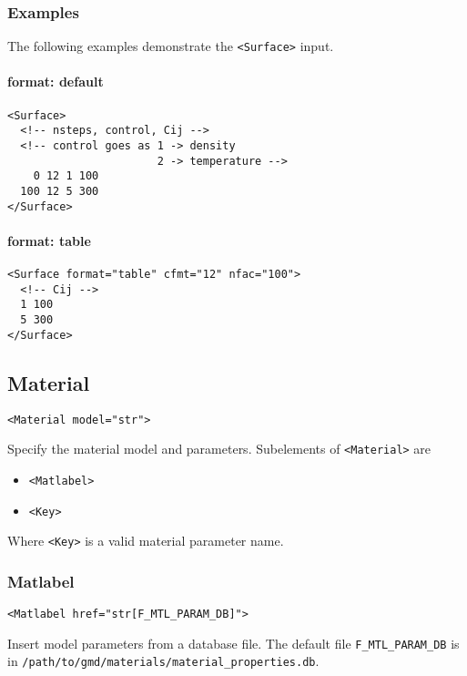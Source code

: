 \documentclass[11pt]{report}
\newcommand{\tag}[1]{\texttt{<#1>}}
\begin{document}
\subsubsection{Examples}
The following examples demonstrate the \tag{Surface} input.

\paragraph{format: default}
\begin{verbatim}
<Surface>
  <!-- nsteps, control, Cij -->
  <!-- control goes as 1 -> density
                       2 -> temperature -->
    0 12 1 100
  100 12 5 300
</Surface>
\end{verbatim}

\paragraph{format: table}
\begin{verbatim}
<Surface format="table" cfmt="12" nfac="100">
  <!-- Cij -->
  1 100
  5 300
</Surface>
\end{verbatim}

\subsection{Material}
\begin{verbatim}
<Material model="str">
\end{verbatim}
%
Specify the material model and parameters. Subelements of \tag{Material} are
%
\begin{itemize}
  \item \tag{Matlabel}
  \item \tag{Key}
\end{itemize}
%
Where \tag{Key} is a valid material parameter name.

\subsubsection{Matlabel}
\begin{verbatim}
<Matlabel href="str[F_MTL_PARAM_DB]">
\end{verbatim}
%
Insert model parameters from a database file.  The default file
\verb|F_MTL_PARAM_DB| is in \verb|/path/to/gmd/materials/material_properties.db|.
\end{document}
